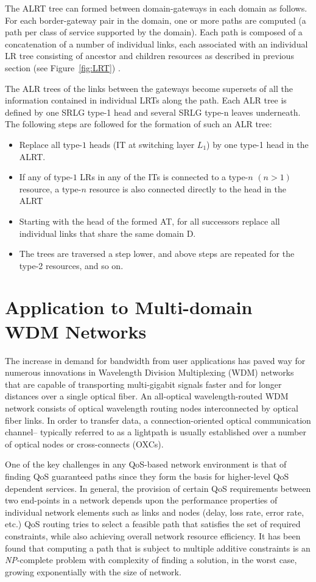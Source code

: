 The ALRT tree can formed between domain-gateways in each domain as follows. For each border-gateway pair in the domain, one or more paths are computed (\eg a path per class of service supported by the domain). Each path is composed of a concatenation of a number of individual links, each associated with an individual LR tree consisting of ancestor and children resources as described in previous section (see Figure~\ref{fig:LRT}) .
 
The ALR trees of the links between the gateways become supersets of all the information contained in individual LRTs along the path. Each ALR tree is defined by one SRLG type-1 head and several SRLG type-n leaves underneath. The following steps are followed for the formation of such an ALR tree:

\begin{itemize}
\item Replace all type-$1$ heads (IT at switching layer $L_1$) by one type-1 head in the ALRT.
\item If any of type-$1$ LRs in any of the ITs is connected to a type-$n$ $(n>1)$ resource, a type-$n$ resource is also connected directly to the head in the ALRT
\item Starting with the head of the formed AT, for all successors replace all individual links that share the same domain D.
\item The trees are traversed a step lower, and above steps are repeated for the type-2 resources, and so on.
\end{itemize}

\section{Application to Multi-domain WDM Networks}
The increase in demand for bandwidth from user applications has paved way for numerous innovations in Wavelength Division Multiplexing (\gls{WDM}) networks that are capable of transporting multi-gigabit signals faster and for longer distances over a single optical fiber. An all-optical wavelength-routed WDM network consists of optical wavelength routing nodes interconnected by optical fiber links. In order to transfer data, a connection-oriented optical communication channel-- typically referred to as a lightpath is usually established over a number of optical nodes or cross-connects (\gls{OXC}s).

One of the key challenges in any QoS-based network environment is that of finding QoS guaranteed paths since they form the basis for higher-level QoS dependent services. In general, the provision of certain QoS requirements between two end-points in a network depends upon the performance properties of individual network elements such as links and nodes (\eg delay, loss rate, error rate, etc.) QoS routing tries to select a feasible path that satisfies the set of required constraints, while also achieving overall network resource efficiency. It has been found that computing a path that is subject to multiple additive constraints is an \emph{NP}-complete problem with complexity of finding a solution, in the worst case, growing exponentially with the size of network.

